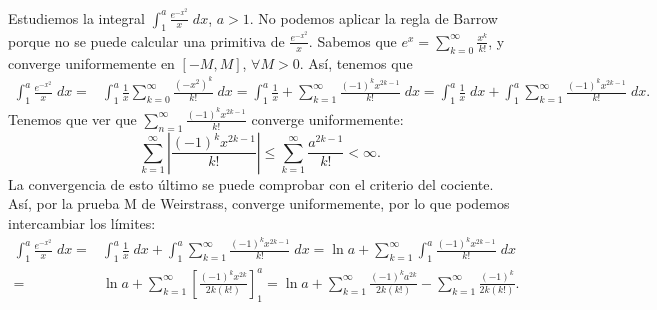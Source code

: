 \begin{eg}
	\normalfont Estudiemos la integral $\displaystyle \int^{a}_{1} \frac{e^{-x^{2}}}{x} \; dx $, $\displaystyle a > 1 $. No podemos aplicar la regla de Barrow porque no se puede calcular una primitiva de $\displaystyle \frac{e^{-x^{2}}}{x} $. Sabemos que $\displaystyle e^{x} = \sum^{\infty}_{k = 0}\frac{x^{k}}{k!} $, y converge uniformemente en $\displaystyle \left[-M, M\right]  $, $\displaystyle \forall M > 0 $. Así, tenemos que
\[
\begin{split}
	\int^{a}_{1} \frac{e^{-x^{2}}}{x} \; dx = & \int^{a}_{1} \frac{1}{x}\sum^{\infty}_{k = 0}\frac{\left(-x^{2}\right)^{k}}{k!} \; dx = \int^{a}_{1} \frac{1}{x} + \sum^{\infty}_{k = 1}\frac{\left(-1\right)^{k}x^{2k-1}}{k!} \; dx = \int^{a}_{1} \frac{1}{x} \; dx + \int^{a}_{1} \sum^{\infty}_{k=1}\frac{\left(-1\right)^{k}x^{2k-1}}{k!} \; dx.
\end{split}
\]
Tenemos que ver que $\displaystyle \sum^{\infty}_{n = 1}\frac{\left(-1\right)^{k}x^{2k-1}}{k!} $ converge uniformemente:
\[ \sum^{\infty}_{k = 1} \left|\frac{\left(-1\right)^{k}x^{2k-1}}{k!}\right| \leq \sum^{\infty}_{k = 1}\frac{a^{2k-1}}{k!} < \infty .\]
La convergencia de esto último se puede comprobar con el criterio del cociente. Así, por la prueba M de Weirstrass, converge uniformemente, por lo que podemos intercambiar los límites:
\[
\begin{split}
	\int^{a}_{1} \frac{e^{-x^{2}}}{x} \; dx = & \int^{a}_{1} \frac{1}{x} \; dx + \int^{a}_{1} \sum^{\infty}_{k=1}\frac{\left(-1\right)^{k}x^{2k-1}}{k!} \; dx = \ln a + \sum^{\infty}_{k = 1}\int^{a}_{1} \frac{\left(-1\right)^{k}x^{2k-1}}{k!} \; dx \\
	= & \ln a + \sum^{\infty}_{k=1}\left[\frac{\left(-1\right)^{k}x^{2k}}{2k\left(k!\right)}\right] ^{a}_{1} = \ln a + \sum^{\infty}_{k=1}\frac{\left(-1\right)^{k}a^{2k}}{2k\left(k!\right)} - \sum^{\infty}_{k=1}\frac{\left(-1\right)^{k}}{2k\left(k!\right)} .
\end{split}
\]
\end{eg}
